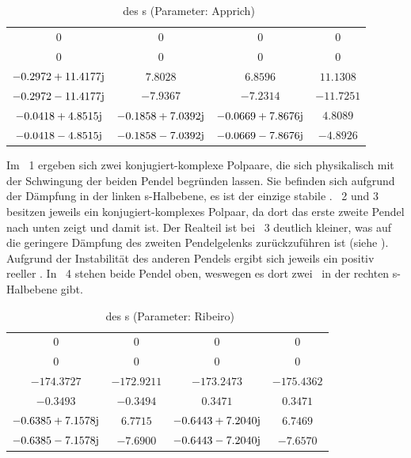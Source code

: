 \begin{table}[htbp]
	\centering
		\begin{tabular}[t]{cccc}
			\toprule
			\ape & \apz & \apd & \apv \\
			\midrule
			$0$	&	$0$	&	$0$	&	$0$	\\
			$0$	&	$0$	&	$0$	&	$0$	\\
			$-0.2972 +11.4177\mathrm{j}$ &    $7.8028						$	&	  $6.8596							$	&   $11.1308$	\\
			$-0.2972 -11.4177\mathrm{j}$ &   $-7.9367						$	&   $-7.2314					$		&  $-11.7251$	\\
			$-0.0418 + 4.8515\mathrm{j}$ &   $-0.1858 + 7.0392\mathrm{j}$	&  $-0.0669 + 7.8676\mathrm{j}$	&  $  4.8089$	\\
			$-0.0418 - 4.8515\mathrm{j}$ &   $-0.1858 - 7.0392\mathrm{j}$	& $ -0.0669 - 7.8676\mathrm{j}	$	&  $ -4.8926$	\\
			\bottomrule
		\end{tabular}
	\caption{\ewe\ des \bss s (Parameter: Apprich)}
	\label{tab:ewappr}
\end{table}
Im \ap\ 1 ergeben sich zwei konjugiert-komplexe Polpaare, die sich physikalisch mit der Schwingung der beiden Pendel begründen lassen. Sie befinden sich aufgrund der Dämpfung in der linken s-Halbebene, es ist der einzige stabile \ap. \ap\ 2 und 3 besitzen jeweils ein konjugiert-komplexes Polpaar, da dort das erste \bzw zweite Pendel nach unten zeigt und damit  ist. Der Realteil ist bei \ap\ 3 deutlich kleiner, was auf die geringere Dämpfung des zweiten Pendelgelenks zurückzuführen ist (siehe ). Aufgrund der Instabilität des anderen Pendels ergibt sich jeweils ein positiv reeller \ew. In \ap\ 4 stehen beide Pendel oben, weswegen es dort zwei \ewe\ in der rechten s-Halbebene gibt.

\begin{table}[htbp]
	\centering
		\begin{tabular}[t]{cccc}
			\toprule
			\ape & \apz & \apd & \apv \\
			\midrule
				$0$	&	$0$	&	$0$	&	$0$	\\
				$0$	&	$0$	&	$0$	&	$0$	\\
				$-174.3727$						&	$-172.9211$	&	$-173.2473$						&	$-175.4362$	\\
				$-0.3493$							&	$-0.3494$		&	$0.3471$							&	$0.3471$	\\
				$-0.6385 + 7.1578\mathrm{j}$	&	$6.7715$		&	$-0.6443 + 7.2040\mathrm{j}$	&	$6.7469$	\\
				$-0.6385 - 7.1578\mathrm{j}$	&	$-7.6900$ 	&	$-0.6443 - 7.2040\mathrm{j}$ &	$-7.6570$ \\
			\bottomrule
		\end{tabular}
	\caption{\ewe\ des \bss s (Parameter: Ribeiro)}
	\label{tab:ewribe}
\end{table}

